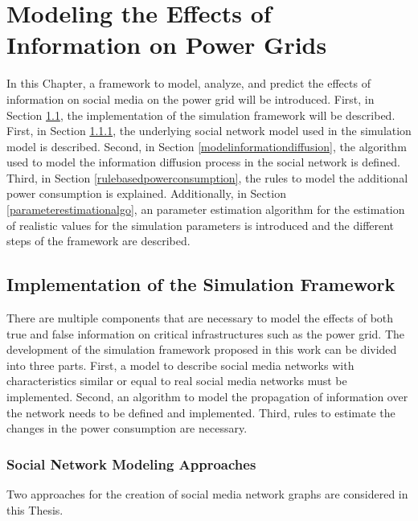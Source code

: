 \chapter{Modeling the Effects of Information on Power Grids}
\label{implementationall}
In this Chapter, a framework to model, analyze, and predict 
the effects of information on social media on the 
power grid will be introduced.
First, in Section \ref{simulationframeworksection}, 
the implementation of the simulation framework will be described.
First, in Section \ref{modelsocialnetwork}, the underlying social network model
used in the simulation model is described. Second, in Section 
\ref{modelinformationdiffusion}, the algorithm used to model
the information diffusion process in the social network is 
defined. Third, in Section \ref{rulebasedpowerconsumption}, 
the rules to model the additional power consumption is explained.
Additionally, in Section \ref{parameterestimationalgo},
an parameter estimation algorithm for the estimation of 
realistic values for the simulation parameters is introduced and 
the different steps of the framework are described.

\section{Implementation of the Simulation Framework}
\label{simulationframeworksection}
There are multiple components that are necessary to model the effects of 
both true and false information on critical infrastructures
such as the power grid. The development of the simulation framework
proposed in this work can be divided into three parts. First, a model 
to describe social media networks with characteristics similar 
or equal to real social media networks must be implemented.
Second, an algorithm to model the 
propagation of information over the network needs to be defined and 
implemented. Third, rules to estimate the changes in the power consumption 
are necessary.

\subsection{Social Network Modeling Approaches}
\label{modelsocialnetwork}
Two approaches for the creation of social media network graphs 
are considered in this Thesis.

